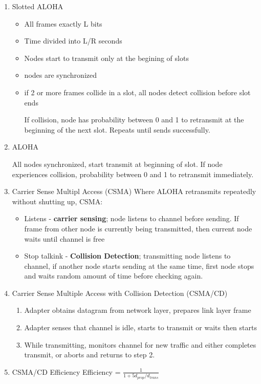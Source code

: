 \documentclass[11pt]{article}
\begin{document}
\begin{enumerate}
\item Slotted ALOHA
\label{sec:orga6acaef}
\begin{itemize}
\item All frames exactly L bits
\item Time divided into L/R seconds
\item Nodes start to transmit only at the begining of slots
\item nodes are synchronized
\item if 2 or more frames collide in a slot, all nodes detect collision before slot ends

If collision, node has probability between 0 and 1 to retransmit at the beginning of the next slot. Repeats until sends successfully.
\end{itemize}

\item ALOHA
\label{sec:orgc773683}

All nodes synchronized, start transmit at beginning of slot. If node experiences collision, probability between 0 and 1 to retransmit immediately.

\item Carrier Sense Multipl Access (CSMA)
\label{sec:org2367790}
Where ALOHA retransmits repeatedly without shutting up, CSMA:
\begin{itemize}
\item Listens - \textbf{carrier sensing}; node listens to channel before sending. If frame from other node is currently being transmitted, then current node waits until channel is free
\item Stop talkink - \textbf{Collision Detection}; transmitting node listens to channel, if another node starts sending at the same time, first node stops and waits random amount of time before checking again.
\end{itemize}

\item Carrier Sense Multiple Access with Collision Detection (CSMA/CD)
\label{sec:org0ba56c4}
\begin{enumerate}
\item Adapter obtains datagram from network layer, prepares link layer frame
\item Adapter senses that channel is idle, starts to transmit or waits then starts
\item While transmitting, monitors channel for new traffic and either completes transmit, or aborts and returns to step 2.
\end{enumerate}

\item CSMA/CD Efficiency
\label{sec:org75658b3}
Efficiency = \(\frac{1}{1+5d_{prop}/d_{trans}}\)
\end{enumerate}
\end{document}
